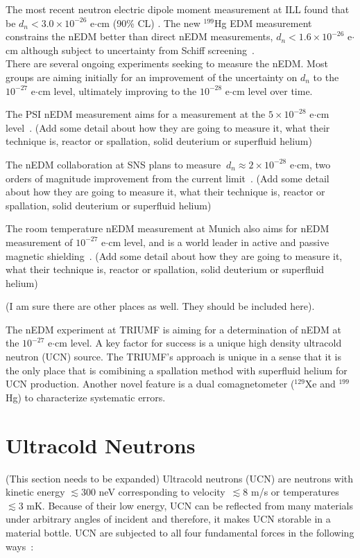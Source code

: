The most recent neutron electric dipole moment measurement at ILL
found that be $d_n< 3.0 \times 10^{-26}$ e$\cdot$cm (90\% CL)
\cite{pendlebury2015revised}. The new $^{199}$Hg EDM
measurement constrains the nEDM better than direct nEDM measurements,
$d_n < 1.6 \times 10^{-26}$ e$\cdot$cm although subject to uncertainty
from Schiff screening~\cite{graner2016reduced}.\\

There are several ongoing experiments seeking to measure the
nEDM. Most groups are aiming initially for an improvement of the
uncertainty on $d_n$ to the $10^{-27}$ e$\cdot$cm level, ultimately
improving to the $10^{-28}$ e$\cdot$cm level over time.

The PSI nEDM measurement aims for a measurement at the $5 \times
10^{-28}$ e$\cdot$cm level~\cite{baker2011search}.  (Add some
  detail about how they are going to measure it, what their technique
  is, reactor or spallation, solid deuterium or superfluid helium)

The nEDM collaboration at SNS plans to measure $\ d_n\approx 2 \times
10^{-28} $ e$\cdot$cm, two orders of magnitude improvement from the
current limit~\cite{peng2008neutron}.  (Add some detail about how
  they are going to measure it, what their technique is, reactor or
  spallation, solid deuterium or superfluid helium)

The room temperature nEDM measurement at Munich also aims for nEDM
measurement of $10^{-27}$ e$\cdot$cm level, and is a world leader in
active and passive magnetic
shielding~\cite{altarev2014magnetically,altarev2015large,altarev2015minimizing,altarev2012next}.
(Add some detail about how they are going to measure it, what their
technique is, reactor or spallation, solid deuterium or superfluid
helium)

(I am sure there are other places as well. They should be included here).

The nEDM experiment at TRIUMF is aiming for a determination of nEDM at
the $10^{-27}$ e$\cdot$cm level. A key
factor for success is a unique high density ultracold neutron (UCN)
source.
The TRIUMF's approach is unique in a
sense that it is the only place that is comibining a spallation method
with superfluid helium for UCN production.
Another novel feature is a dual comagnetometer ($^{129}$Xe and
$^{199}$Hg) to characterize systematic errors.


\section{Ultracold Neutrons}
(This section needs to be expanded)
Ultracold neutrons (UCN) are neutrons with kinetic energy $\lesssim
300$ neV corresponding to velocity~$\lesssim 8$ m/s or temperatures
$\lesssim 3$ mK. Because of their low energy, UCN can be reflected
from many materials under arbitrary angles of incident and therefore,
it makes UCN storable in a material bottle. UCN are subjected to all
four fundamental forces in the following
ways~\cite{beatrice,knecht,golub1994neutron,golub1991ultra}:

